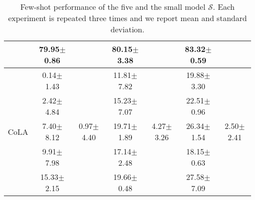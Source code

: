 \begin{table*}[h]
\begin{tabular}{c|cc|cc|cc|}
\multicolumn{1}{|c|}{}       & \multicolumn{1}{c|}{79.95$\pm$0.86} &                   & \multicolumn{1}{c|}{80.15$\pm$3.38} &                   & \multicolumn{1}{c|}{83.32$\pm$0.59} &                   \\ \hline
\multicolumn{1}{|c|}{}       & \multicolumn{1}{c|}{ 0.14$\pm$1.43} &                   & \multicolumn{1}{c|}{11.81$\pm$7.82} &                   & \multicolumn{1}{c|}{19.88$\pm$3.30} &                   \\
\multicolumn{1}{|c|}{}       & \multicolumn{1}{c|}{ 2.42$\pm$4.84} &                   & \multicolumn{1}{c|}{15.23$\pm$7.07} &                   & \multicolumn{1}{c|}{22.51$\pm$0.96} &                   \\
\multicolumn{1}{|c|}{CoLA}   & \multicolumn{1}{c|}{ 7.40$\pm$8.12} & 0.97$\pm$4.40     & \multicolumn{1}{c|}{19.71$\pm$1.89} & 4.27$\pm$3.26     & \multicolumn{1}{c|}{26.34$\pm$1.54} & 2.50$\pm$2.41 \\
\multicolumn{1}{|c|}{}       & \multicolumn{1}{c|}{ 9.91$\pm$7.98} &                   & \multicolumn{1}{c|}{17.14$\pm$2.48} &                   & \multicolumn{1}{c|}{18.15$\pm$0.63} &                   \\
\multicolumn{1}{|c|}{}       & \multicolumn{1}{c|}{15.33$\pm$2.15} &                   & \multicolumn{1}{c|}{19.66$\pm$0.48} &                   & \multicolumn{1}{c|}{27.58$\pm$7.09} &                   \\ \hline
\end{tabular}
\caption{Few-shot performance of the five \mdrs
  and the small model $\mathcal{S}$.
  Each experiment is repeated three times and we report mean and standard deviation.}
\end{table*}


